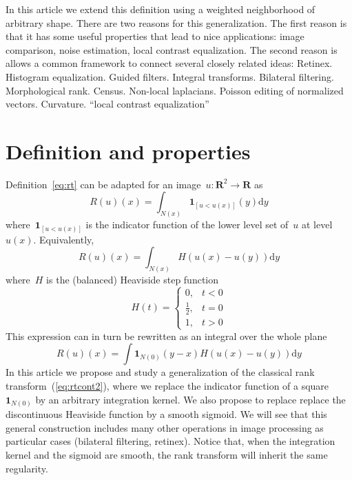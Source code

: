 \documentclass[12pt]{article}                  %
\begin{document}
In this article we extend this definition using a weighted neighborhood of
arbitrary shape.
There are two reasons for this generalization.
The first reason is that it has some useful properties that lead to nice
applications: image comparison, noise estimation, local contrast
equalization.
The second reason is allows a common framework to connect several closely
related ideas:
Retinex.  Histogram equalization.  Guided filters.  Integral transforms.
Bilateral filtering.
Morphological rank.  Census.  Non-local laplacians.  Poisson editing of
normalized vectors.  Curvature. ``local contrast equalization''
\clearpage


\section{Definition and properties}

Definition~\ref{eq:rt} can be adapted for an
image~$u:\mathbf{R}^2\to\mathbf{R}$ as
\begin{equation}\label{eq:rtcont}
	R(u)(x) = \int_{N(x)}\mathbf{1}_{\left[u < u(x)\right]}(y)\mathrm{d}y
\end{equation}
where~$\mathbf{1}_{\left[u < u(x)\right]}$ is the indicator function of the
lower level set of~$u$ at level~$u(x)$.  Equivalently,
\begin{equation}\label{eq:rtcont}
	R(u)(x) = \int_{N(x)}H(u(x)-u(y))\mathrm{d}y
\end{equation}
where~$H$ is the (balanced) Heaviside step function
\begin{equation}\label{eq:heaviside}
	H(t)=\begin{cases}
		0,&t< 0\\
		\frac12,&t=0\\
		1,& t>0
\end{cases}
\end{equation}
This expression can in turn be rewritten as an integral over the whole plane
\begin{equation}\label{eq:rtcont2}
	R(u)(x) = \int\mathbf{1}_{N(0)}(y-x)H(u(x)-u(y))\mathrm{d}y
\end{equation}
In this article we propose and study a generalization of the classical rank
transform~(\ref{eq:rtcont2}), where we replace the indicator function of a
square~$\mathbf{1}_{N(0)}$ by an arbitrary integration kernel.
We also propose to replace
replace the discontinuous Heaviside function by a smooth sigmoid.
We will see that this general construction includes many other operations in
image processing as particular cases (bilateral filtering, retinex).
Notice that, when the integration kernel and the sigmoid are smooth, the
rank transform will inherit the same regularity.
\end{document}
